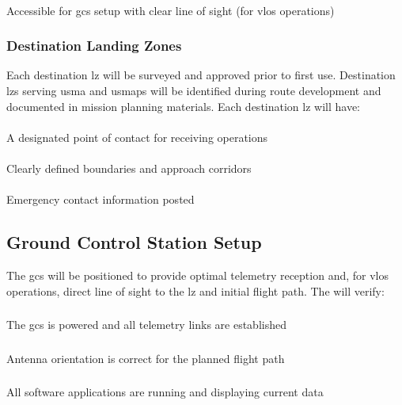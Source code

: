             \paragraph{} Accessible for \ac{gcs} setup with clear line of sight (for \ac{vlos} operations)

        \subsubsection{Destination Landing Zones} Each destination \ac{lz} will be surveyed and approved prior to first use. Destination \acp{lz} serving \ac{usma} and \ac{usmaps} will be identified during route development and documented in mission planning materials. Each destination \ac{lz} will have:

            \paragraph{} A designated point of contact for receiving operations
            \paragraph{} Clearly defined boundaries and approach corridors
            \paragraph{} Emergency contact information posted

    \subsection{Ground Control Station Setup}\label{ssec:gcssetup}

        The \ac{gcs} will be positioned to provide optimal telemetry reception and, for \ac{vlos} operations, direct line of sight to the \ac{lz} and initial flight path. The  will verify:

            \subsubsection{} The \ac{gcs} is powered and all telemetry links are established
            \subsubsection{} Antenna orientation is correct for the planned flight path
            \subsubsection{} All software applications are running and displaying current data
